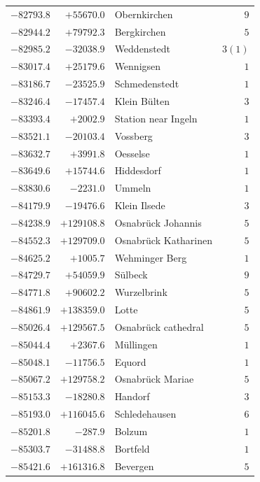 \begin{center}
\begin{tabular}{r|r|p{170pt}|r}
\(-82793.8\)&\(+55670.0\)&Obernkirchen&\(9\)\\
\(-82944.2\)&\(+79792.3\)&Bergkirchen&\(5\)\\
\(-82985.2\)&\(-32038.9\)&Weddenstedt&\(3 (1)\)\\
\(-83017.4\)&\(+25179.6\)&Wennigsen&\(1\)\\
\(-83186.7\)&\(-23525.9\)&Schmedenstedt&\(1\)\\
\(-83246.4\)&\(-17457.4\)&Klein Bülten&\(3\)\\
\(-83393.4\)&\(+2002.9\)&Station near Ingeln&\(1\)\\
\(-83521.1\)&\(-20103.4\)&Vossberg&\(3\)\\
\(-83632.7\)&\(+3991.8\)&Oesselse&\(1\)\\
\(-83649.6\)&\(+15744.6\)&Hiddesdorf&\(1\)\\
\(-83830.6\)&\(-2231.0\)&Ummeln&\(1\)\\
\(-84179.9\)&\(-19476.6\)&Klein Ilsede&\(3\)\\
\(-84238.9\)&\(+129108.8\)&Osnabrück Johannis&\(5\)\\
\(-84552.3\)&\(+129709.0\)&Osnabrück Katharinen&\(5\)\\
\(-84625.2\)&\(+1005.7\)&Wehminger Berg&\(1\)\\
\(-84729.7\)&\(+54059.9\)&Sülbeck&\(9\)\\
\(-84771.8\)&\(+90602.2\)&Wurzelbrink&\(5\)\\
\(-84861.9\)&\(+138359.0\)&Lotte&\(5\)\\
\(-85026.4\)&\(+129567.5\)&Osnabrück cathedral&\(5\)\\
\(-85044.4\)&\(+2367.6\)&Müllingen&\(1\)\\
\(-85048.1\)&\(-11756.5\)&Equord&\(1\)\\
\(-85067.2\)&\(+129758.2\)&Osnabrück Mariae&\(5\)\\
\(-85153.3\)&\(-18280.8\)&Handorf&\(3\)\\
\(-85193.0\)&\(+116045.6\)&Schledehausen&\(6\)\\
\(-85201.8\)&\(-287.9\)&Bolzum&\(1\)\\
\(-85303.7\)&\(-31488.8\)&Bortfeld&\(1\)\\
\(-85421.6\)&\(+161316.8\)&Bevergen&\(5\)\\
\hline\end{tabular}\endgroup\end{center}
\clearpage

